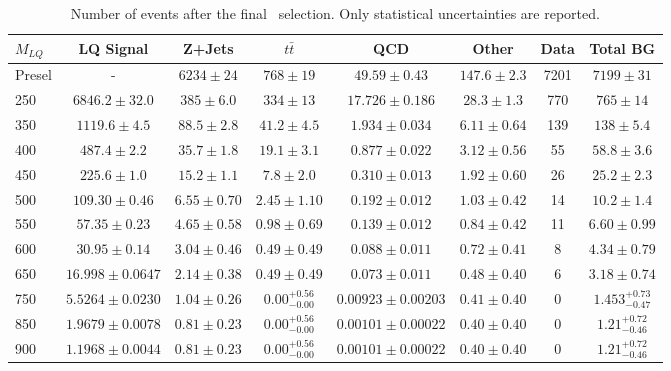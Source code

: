 \begin{table} 
\small 
\begin{tabular}{l | c | c | c | c | c | c | c } 
$M_{LQ}$ & LQ Signal & Z+Jets & $t\bar{t}$ & QCD & Other & Data &  Total BG \\ 
  \hline 
  \hline 
Presel & -                   &  $ 6234 \pm 24 $   & $ 768 \pm 19 $        & $ 49.59 \pm 0.43 $       & $ 147.6 \pm 2.3 $ &7201 & $ 7199 \pm 31 $ \\ 
  \hline 
250 &  $ 6846.2 \pm 32.0 $   &  $ 385 \pm 6.0 $   & $ 334 \pm 13 $        & $ 17.726 \pm 0.186 $     & $ 28.3 \pm 1.3  $ &770 & $ 765 \pm 14 $ \\ 
350 &  $ 1119.6 \pm 4.5 $    &  $ 88.5 \pm 2.8 $  & $ 41.2 \pm 4.5 $      & $ 1.934 \pm 0.034 $      & $ 6.11 \pm 0.64 $ &139 & $ 138 \pm 5.4 $ \\ 
400 &  $ 487.4 \pm 2.2 $     &  $ 35.7 \pm 1.8 $  & $ 19.1 \pm 3.1 $      & $ 0.877 \pm 0.022 $      & $ 3.12 \pm 0.56 $ &55  & $ 58.8 \pm 3.6 $ \\ 
450 &  $ 225.6 \pm 1.0 $     &  $ 15.2 \pm 1.1 $  & $ 7.8 \pm 2.0 $       & $ 0.310 \pm 0.013 $      & $ 1.92 \pm 0.60 $ &26  & $ 25.2 \pm 2.3 $ \\ 
500 &  $ 109.30 \pm 0.46 $   &  $ 6.55 \pm 0.70 $ & $ 2.45 \pm 1.10 $     & $ 0.192 \pm 0.012 $      & $ 1.03 \pm 0.42 $ &14  & $ 10.2 \pm 1.4 $ \\ 
550 &  $ 57.35 \pm 0.23 $    &  $ 4.65 \pm 0.58 $ & $ 0.98 \pm 0.69 $     & $ 0.139 \pm 0.012 $      & $ 0.84 \pm 0.42 $ &11  & $ 6.60 \pm 0.99 $ \\ 
600 &  $ 30.95 \pm 0.14 $    &  $ 3.04 \pm 0.46 $ & $ 0.49 \pm 0.49 $     & $ 0.088 \pm 0.011 $      & $ 0.72 \pm 0.41 $ &8   & $ 4.34 \pm 0.79 $ \\ 
650 &  $ 16.998 \pm 0.0647 $ &  $ 2.14 \pm 0.38 $ & $ 0.49 \pm 0.49 $     & $ 0.073 \pm 0.011 $      & $ 0.48 \pm 0.40 $ &6   & $ 3.18 \pm 0.74 $ \\ 
750 &  $ 5.5264 \pm 0.0230 $ &  $ 1.04 \pm 0.26 $ & $ 0.00_{-0.00}^{+0.56}$ &  $ 0.00923 \pm 0.00203 $ & $ 0.41 \pm 0.40 $ &0   & $ 1.453_{-0.47}^{+0.73}$ \\ 
850 &  $ 1.9679 \pm 0.0078 $ &  $ 0.81 \pm 0.23 $ & $ 0.00_{-0.00}^{+0.56}$ &  $ 0.00101 \pm 0.00022 $ & $ 0.40 \pm 0.40 $ &0   & $ 1.21_{-0.46}^{+0.72}$ \\ 
900 &  $ 1.1968 \pm 0.0044 $ &  $ 0.81 \pm 0.23 $ & $ 0.00_{-0.00}^{+0.56}$ &  $ 0.00101 \pm 0.00022 $ & $ 0.40 \pm 0.40 $ &0   & $ 1.21_{-0.46}^{+0.72}$ \\ 
\end{tabular}
\caption{Number of events after the final \eejj~selection. Only statistical uncertainties are reported.}
\label{tab:eejjFinalSelection}
\end{table}


